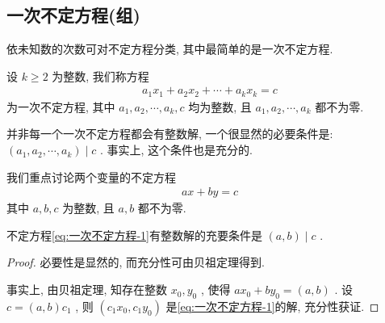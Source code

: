 \subsection{一次不定方程(组)}
依未知数的次数可对不定方程分类, 其中最简单的是一次不定方程.

设 $k \geqslant 2$ 为整数, 我们称方程
\begin{align*}
	a_{1} x_{1}+a_{2} x_{2}+\cdots+a_{k} x_{k}=c
\end{align*}
为一次不定方程, 其中 $a_{1} ,  a_{2} ,  \cdots ,  a_{k} ,  c$ 均为整数, 且 $a_{1} ,  a_{2} ,  \cdots ,  a_{k}$ 都不为零.

并非每一个一次不定方程都会有整数解, 一个很显然的必要条件是:  $\left(a_{1}, a_{2}, \cdots, a_{k}\right) \mid c$ . 事实上, 这个条件也是充分的.

我们重点讨论两个变量的不定方程
\begin{align}\label{eq:一次不定方程-1}
	a x+b y=c
\end{align}
其中 $a ,  b ,  c$ 为整数, 且 $a ,  b$ 都不为零.

\begin{theorem}\label{thm:一次不定方程-1}
	不定方程\ref{eq:一次不定方程-1}有整数解的充要条件是 $(a, b) \mid c$ .
\end{theorem}
\begin{proof}
	必要性是显然的, 而充分性可由贝祖定理得到.

	事实上, 由贝祖定理, 知存在整数 $x_{0} ,  y_{0}$ , 使得 $a x_{0}+b y_{0}=(a, b)$ . 设 $c=(a, b) c_{1}$ , 则 $\left(c_{1} x_{0}, c_{1} y_{0}\right)$ 是\autoref{eq:一次不定方程-1}的解, 充分性获证.
\end{proof}

